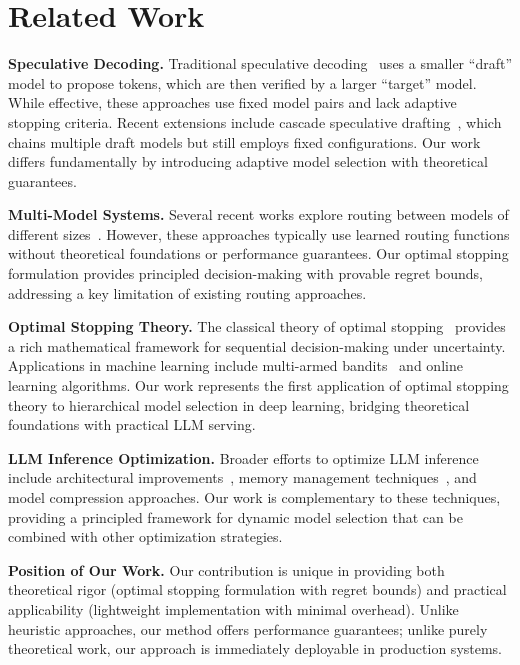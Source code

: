 \documentclass{article}
\theoremstyle{plain}
\theoremstyle{definition}
\theoremstyle{remark}
\begin{document}
\section{Related Work}
\label{sec:related}
\textbf{Speculative Decoding.} Traditional speculative decoding~\citep{chen2023accelerating,leviathan2023fast} uses a smaller ``draft'' model to propose tokens, which are then verified by a larger ``target'' model. While effective, these approaches use fixed model pairs and lack adaptive stopping criteria. Recent extensions include cascade speculative drafting~\citep{zhou2023cascade}, which chains multiple draft models but still employs fixed configurations. Our work differs fundamentally by introducing adaptive model selection with theoretical guarantees.

\textbf{Multi-Model Systems.} Several recent works explore routing between models of different sizes~\citep{li2024branchtrain}. However, these approaches typically use learned routing functions without theoretical foundations or performance guarantees. Our optimal stopping formulation provides principled decision-making with provable regret bounds, addressing a key limitation of existing routing approaches.

\textbf{Optimal Stopping Theory.} The classical theory of optimal stopping~\citep{robbins1971convergence} provides a rich mathematical framework for sequential decision-making under uncertainty. Applications in machine learning include multi-armed bandits~\citep{auer2002finite,lai1985asymptotically} and online learning algorithms. Our work represents the first application of optimal stopping theory to hierarchical model selection in deep learning, bridging theoretical foundations with practical LLM serving.

\textbf{LLM Inference Optimization.} Broader efforts to optimize LLM inference include architectural improvements~\citep{shazeer2019fast}, memory management techniques~\citep{hu2023cacheflow}, and model compression approaches. Our work is complementary to these techniques, providing a principled framework for dynamic model selection that can be combined with other optimization strategies.

\textbf{Position of Our Work.} Our contribution is unique in providing both theoretical rigor (optimal stopping formulation with regret bounds) and practical applicability (lightweight implementation with minimal overhead). Unlike heuristic approaches, our method offers performance guarantees; unlike purely theoretical work, our approach is immediately deployable in production systems.
\end{document}
